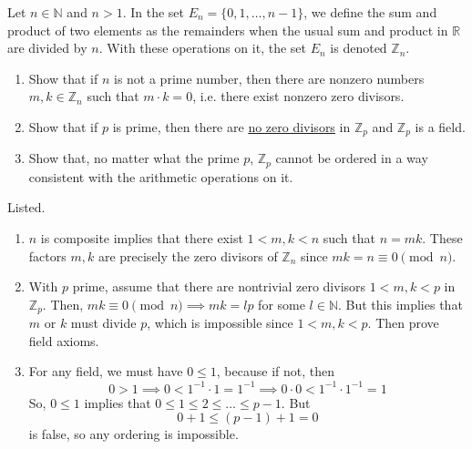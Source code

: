   \begin{exercise}[Zorich 2.2.22]
    Let $n \in \mathbb{N}$ and $n > 1$. In the set $E_n = \{0, 1, \ldots, n-1\}$, we define the sum and product of two elements as the remainders when the usual sum and product in $\mathbb{R}$ are divided by $n$. With these operations on it, the set $E_n$ is denoted $\mathbb{Z}_n$. 
    \begin{enumerate}
      \item Show that if $n$ is not a prime number, then there are nonzero numbers $m, k \in \mathbb{Z}_n$ such that $m \cdot k = 0$, i.e. there exist nonzero zero divisors. 
      \item Show that if $p$ is prime, then there are \hyperref[lin-thm:no-zero-divisors]{no zero divisors} in $\mathbb{Z}_p$ and $\mathbb{Z}_p$ is a field. 
      \item Show that, no matter what the prime $p$, $\mathbb{Z}_p$ cannot be ordered in a way consistent with the arithmetic operations on it. 
    \end{enumerate}
  \end{exercise}
  \begin{solution}
    Listed. 
    \begin{enumerate}
      \item $n$ is composite implies that there exist $1 < m, k < n$ such that $n = m k$. These factors $m, k$ are precisely the zero divisors of $\mathbb{Z}_n$ since $m k = n \equiv 0 \pmod{n}$. 
      \item With $p$ prime, assume that there are nontrivial zero divisors $1 < m, k < p$ in $\mathbb{Z}_p$. Then, $m k \equiv 0 \pmod{n} \implies m k = l p$ for some $l \in \mathbb{N}$. But this implies that $m$ or $k$ must divide $p$, which is impossible since $1 < m, k < p$. Then prove field axioms. 
      \item For any field, we must have $0 \leq 1$, because if not, then 
      \begin{equation}
        0 > 1 \implies 0 < 1^{-1} \cdot 1 = 1^{-1} \implies 0 \cdot 0 < 1^{-1} \cdot 1^{-1} = 1
      \end{equation}
      So, $0 \leq 1$ implies that $0 \leq 1 \leq 2 \leq \ldots \leq p-1$. But 
      \begin{equation}
        0 + 1 \leq (p - 1) + 1 = 0
      \end{equation}
      is false, so any ordering is impossible. 
    \end{enumerate}
  \end{solution}

